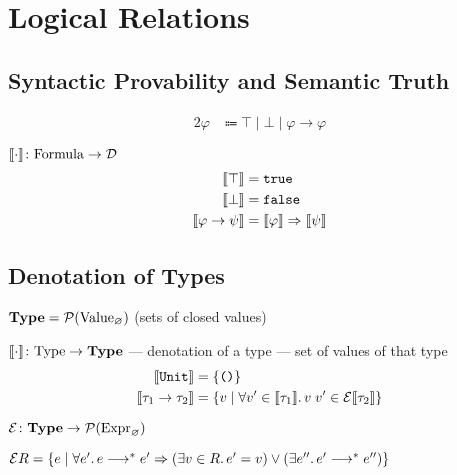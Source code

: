 \chapter{Logical Relations}

\section{Syntactic Provability and Semantic Truth}


\begin{alignat*}{2}
  \varphi & \Coloneqq \top \mid \bot \mid \varphi \to \varphi
\end{alignat*}

$\llbracket\cdot\rrbracket \colon \mathrm{Formula} \to \mathcal{D}$
\begin{alignat*}{2}
  \llbracket\top\rrbracket & = \texttt{true} \\
  \llbracket\bot\rrbracket & = \texttt{false} \\
  \llbracket\varphi \to \psi\rrbracket & = \llbracket\varphi\rrbracket \Rightarrow \llbracket\psi\rrbracket
\end{alignat*}

\section{Denotation of Types}

$\textbf{Type} = \mathcal{P}(\mathrm{Value}_{\varnothing})$
(sets of closed values)

$\llbracket\cdot\rrbracket \colon \mathrm{Type} \to \textbf{Type}$ ---
  denotation of a type --- set of values of that type
\begin{alignat*}{2}
  \llbracket\texttt{Unit}\rrbracket & = \{\texttt{()}\} \\
  \llbracket\tau_1 \to \tau_2\rrbracket & = \{ v \mid
    \forall v' \in \llbracket\tau_1\rrbracket\ldotp v\;v' \in \mathcal{E}\llbracket\tau_2\rrbracket \}
\end{alignat*}

$\mathcal{E} \colon \textbf{Type} \to
  \mathcal{P}(\mathrm{Expr}_{\varnothing})$

$\mathcal{E}R = \{ e \mid \forall e'\ldotp e \longrightarrow^* e'
  \Rightarrow (\exists v \in R \ldotp e'=v) \lor
    (\exists e'' \ldotp e'\longrightarrow^*e'') \}$

